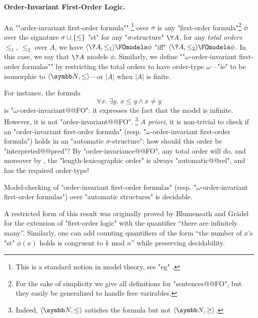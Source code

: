 \paragraph*{Order-Invariant First-Order Logic.}
An \AP""order-invariant first-order formula""%
\footnote{This is a standard notion in model theory, see "eg"
\cite[Exercise~3.1.12]{Gradel2007FiniteModelTheory}.}
over $\sigma$
is any "first-order formula"\footnote{For the sake of simplicity we give all definitions
for "sentences@@FO", but they easily be generalized to handle free varirables.} $\phi$
over the signature $\sigma \sqcup \{\leq\}$ "st" for any
"$\sigma$-structure" $\?A$, for any \emph{total orders} $\leq_1$, $\leq_2$ over $A$,
we have $\tup{\?A, \leq_1} \FOmodels \phi$ "iff" $\tup{\?A, \leq_2} \FOmodels \phi$.
In this case, we say that $\?A$ models $\phi$.
Similarly, we define \AP""$\omega$-order-invariant first-order formulas""
\cite[\S~3.2]{Rubin2008AutomataPresentingStructures}
by restricting the total orders to have order-type $\omega$---"ie" to be
isomorphic to $\tup{\N, \leq}$---or $|A|$ when $|A|$ is finite.

For instance, the formula
\[
	\forall x.\; \exists y.\; x \leq y \land x \neq y
\]
is "$\omega$-order-invariant@@FO": it expresses the fact that the model is infinite.
However, it is not "order-invariant@@FO".%
\footnote{Indeed, $\tup{\N, \leq}$ satisfies the formula but not $\tup{\N, \geq}$.}
\emph{A priori}, it is non-trivial to check if an "order-invariant first-order formula"
(resp. "$\omega$-order-invariant first-order formula") holds in an
"automatic $\sigma$-structure": how should this order be "interpreted@@pred"?
By "order-invariance@@FO", any total order will do, and moreover by
, the "length-lexicographic order" is always "automatic@@rel",
and has the required order-type!

\begin{proposition}
	\label{prop:order-invariance}
	Model-checking of "order-invariant first-order formulas"
	(resp. "$\omega$-order-invariant first-order formulas") over "automatic structures"
	is decidable.
\end{proposition}

A restricted form of this result was originally proved by Blumensath and Grädel
\cite[Corollary~5.4]{BlumensathGradel2004FinitePresentations} for the extension of
"first-order logic" with the quantifier ``there are infinitely many''.
Similarly, one can add counting quantifiers of the form ``the number of $x$'s "st" $\phi(x)$ holds
is congruent to $k$ mod $n$'' \cite[\S~3.2]{Rubin2008AutomataPresentingStructures}
while preserving decidability.

